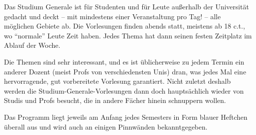 
Das Studium Generale ist für Studenten und für Leute außerhalb der Universität
  gedacht und deckt -- mit mindestens einer Veranstaltung pro Tag! -- alle
  möglichen Gebiete ab.  Die Vorlesungen finden abends statt, meistens ab 18
  c.t., wo "`normale"' Leute Zeit haben.  Jedes Thema hat dann seinen festen Zeitplatz im
  Ablauf der Woche.

Die Themen sind  sehr interessant, und es ist üblicherweise
  zu jedem Termin ein anderer Dozent (meist Profs von verschiedensten Unis)
  dran, was jedes Mal eine hervorragende, gut vorbereitete Vorlesung
  garantiert.  Nicht zuletzt deshalb werden die Studium-Generale-Vorlesungen
  dann doch hauptsächlich wieder von Studis und Profs besucht, die in
  andere Fächer hinein schnuppern wollen.

Das Programm liegt jeweils am Anfang jedes Semesters in Form blauer
  Heftchen überall aus  und wird auch an einigen Pinnwänden  bekanntgegeben.
